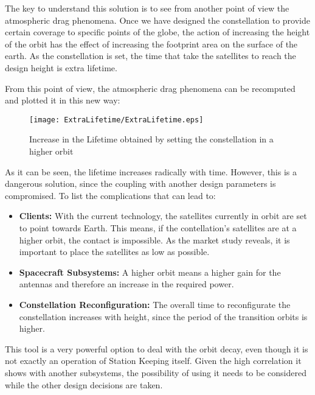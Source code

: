 The key to understand this solution is to see from another point of view the atmospheric drag phenomena. Once we have designed the constellation to provide certain coverage to specific points of the globe, the action of increasing the height of the orbit has the effect of increasing the footprint area on the surface of the earth. As the constellation is set, the time that take the satellites to reach the design height is extra lifetime. 

From this point of view, the atmospheric drag phenomena can be recomputed and plotted it in this new way:

\begin{figure}[H]
\centering
\texttt{[image: ExtraLifetime/ExtraLifetime.eps]}
\caption{Increase in the Lifetime obtained by setting the constellation in a higher orbit}
\end{figure}

As it can be seen, the lifetime increases radically with time. However, this is a dangerous solution, since the coupling with another design parameters is compromised. To list the complications that can lead to:

\begin{itemize}
\item \textbf{Clients: }With the current technology, the satellites currently in orbit are set to point towards Earth. This means, if the contellation's satellites are at a higher orbit, the contact is impossible. As the market study reveals, it is important to place the satellites as low as possible.
\item \textbf{Spacecraft Subsystems: }A higher orbit means a higher gain for the antennas and therefore an increase in the required power.
\item \textbf{Constellation Reconfiguration: } The overall time to reconfigurate the constellation increases with height, since the period of the transition orbits is higher.
\end{itemize}

This tool is a very powerful option to deal with the orbit decay, even though it is not exactly an operation of Station Keeping itself. Given the high correlation it shows with another subsystems, the possibility of using it needs to be considered while the other design decisions are taken.